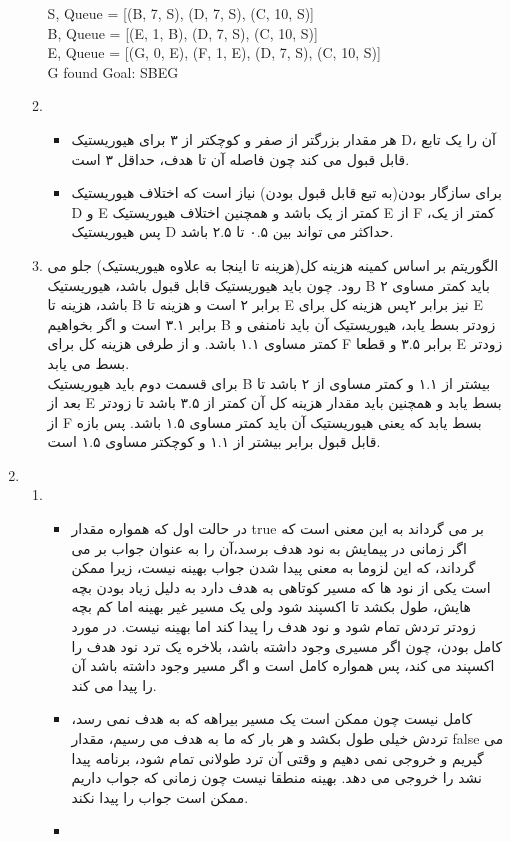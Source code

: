 \documentclass[11pt]{article}
\begin{document}
\begin{enumerate}
\begin{enumerate}
\begin{latin}
	S, Queue = [(B, 7, S), (D, 7, S), (C, 10, S)]\\
	B, Queue = [(E, 1, B), (D, 7, S), (C, 10, S)]\\
	E, Queue = [(G, 0, E), (F, 1, E), (D, 7, S), (C, 10, S)]\\
	G found Goal: SBEG
\end{latin}
\item
\begin{itemize}
	\item 
	هر مقدار بزرگتر از صفر و کوچکتر از ۳ برای هیوریستیک D، آن را یک تابع قابل قبول می کند چون فاصله آن تا هدف، حداقل ۳ است.\\
	\item
	برای سازگار بودن(به تبع قابل قبول بودن) نیاز است که اختلاف هیوریستیک D و E کمتر از یک باشد و همچنین اختلاف هیوریستیک E از F کمتر از یک، پس هیوریستیک D حداکثر می تواند بین ۰.۵ تا ۲.۵ باشد.
\end{itemize}
\item
الگوریتم 
بر اساس کمینه هزینه کل(هزینه تا اینجا به علاوه هیوریستیک) جلو می رود. چون باید هیوریستیک قابل قبول باشد، هیوریستیک B باید کمتر مساوی ۲ باشد، هزینه تا B برابر ۲ است و هزینه تا E نیز برابر ۲پس هزینه کل برای E برابر ۳.۱ است و اگر بخواهیم B زودتر بسط یابد، هیوریستیک آن باید نامنفی و کمتر مساوی ۱.۱ باشد. و از طرفی هزینه کل برای F برابر ۳.۵ و قطعا E  زودتر بسط می یابد.\\
برای قسمت دوم باید هیوریستیک B بیشتر از ۱.۱ و کمتر مساوی از ۲ باشد تا بعد از E بسط یابد و همچنین باید مقدار هزینه کل آن کمتر از ۳.۵ باشد تا زودتر از  F بسط یابد که یعنی هیوریستیک آن باید کمتر مساوی ۱.۵ باشد. پس بازه قابل قبول برابر بیشتر از ۱.۱ و کوچکتر مساوی ۱.۵ است.\\

\end{enumerate}
\item
\begin{enumerate}
	\item 
	\begin{itemize}
		\item 

	در حالت اول که همواره مقدار true بر می گرداند به این معنی است که اگر زمانی در پیمایش به نود هدف برسد،آن را به عنوان جواب بر می گرداند، که این لزوما به معنی پیدا شدن جواب بهینه نیست، زیرا ممکن است یکی از نود ها که مسیر کوتاهی به هدف دارد به دلیل زیاد بودن بچه هایش، طول بکشد تا اکسپند شود ولی یک مسیر غیر بهینه اما کم بچه زودتر تردش تمام شود و نود هدف را پیدا کند اما بهینه نیست. در مورد کامل بودن، چون اگر مسیری وجود داشته باشد، بلاخره یک ترد نود هدف را اکسپند می کند، پس همواره کامل است و اگر مسیر وجود داشته باشد آن را پیدا می کند.\\
	\item
	کامل نیست چون ممکن است یک مسیر بیراهه که به هدف نمی رسد، تردش خیلی طول بکشد و هر بار که ما به هدف می رسیم، مقدار false می گیریم و خروجی نمی دهیم و وقتی آن ترد طولانی تمام شود، برنامه پیدا نشد را خروجی می دهد. بهینه منطقا نیست چون زمانی که جواب داریم ممکن است جواب را پیدا نکند.
	\item
		\end{itemize}
\end{enumerate}
	\end{enumerate}
\end{document}
